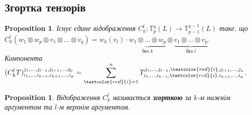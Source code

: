 \documentclass[a4paper, 10pt]{article}
\theoremstyle{theoremdd}
\newtheorem{proposition}[theorem]{Proposition}
\begin{document}
\subsection{Згортка тензорів}
\begin{proposition}
Існує єдине відображення $C_k^l \colon \mathbb{T}_p^q(L) \to \mathbb{T}_{p-1}^{q-1}(L)$ таке, що \\
$C_k^l(w_1 \otimes w_p \otimes v_1 \otimes \dots \otimes v_q) = w_k(v_l) \cdot \underbrace{w_1 \otimes \dots \otimes w_p}_{\text{без }k} \otimes \underbrace{v_1 \otimes \dots \otimes v_p}_{\text{без }l}$.\\
Компонента $(C_k^l T)_{i_1,\dots,i_{k-1},i_{k+1},\dots,i_p}^{j_1,\dots,j_{l-1},j_{l+1},\dots,q_j} = \displaystyle\sum_{\textcolor{red}{i}=1}^n T_{i_1,\dots,i_{k-1},\textcolor{red}{i},i_{k+1},\dots,i_p}^{j_1,\dots,j_{l-1},\textcolor{red}{i},j_{l+1},\dots,j_q}$.
\end{proposition}

\begin{proposition}
Відображення $C_k^l$ називається \textbf{згорткою} за $k$-м нижнім аргументом та $l$-м верхнім аргументом.
\end{proposition}
\end{document}
